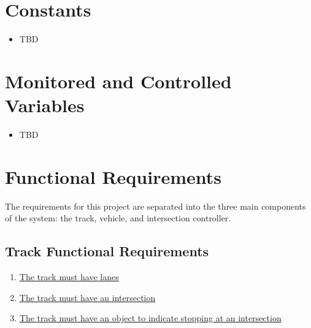 \documentclass [11pt]{article}
\begin{document}
\section{Constants}
\begin{itemize}
\item TBD

\end{itemize}


\section{Monitored and Controlled Variables}
\begin{itemize}
\item TBD

\end{itemize}


\section {Functional Requirements} 
The requirements for this project are separated into the three main components of the system: the track, vehicle, and intersection controller.






\subsection{Track Functional Requirements}
\begin{enumerate}[label=\textbf{T\arabic*:}, ref=T\arabic*, leftmargin =0.8in]
	\item \label{T1} \hyperref[sec:changeL]{The track must have lanes } %
	\item \label{T2} \hyperref[sec:changeL]{The track must have an intersection} %
	\item \label {T3} \hyperref[sec:changeL]{The track must have an object to indicate stopping at an intersection}  %
\end{enumerate}
\end{document}
